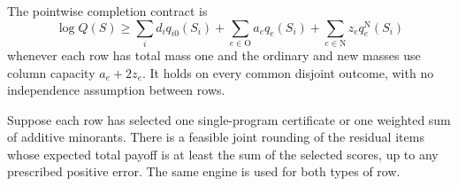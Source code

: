 The pointwise completion contract is
\begin{equation}\label{simp:pointwise-contract}
 \log Q(S)\ge\sum_i d_iq_{i0}(S_i)
       +\sum_{e\in\mathrm O}a_eq_e(S_i)
       +\sum_{e\in\mathrm N}z_eq_e^{\mathrm N}(S_i)
\end{equation}
whenever each row has total mass one and the ordinary and new masses
use column capacity $a_e+2z_e$.  It holds on every common disjoint
outcome, with no independence assumption between rows.

\begin{lemma}\label{simp:forest}
Suppose each row has selected one single-program certificate or one
weighted sum of additive minorants.  There is a feasible joint rounding
of the residual items whose expected total payoff is at least the sum
of the selected scores, up to any prescribed positive error.  The same
engine is used for both types of row.
\end{lemma}
